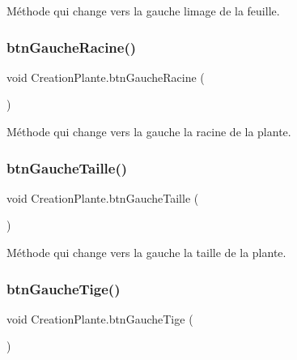 Méthode qui change vers la gauche l\textquotesingle{}image de la feuille. \mbox{\label{class_creation_plante_a8040abc57585cfdc860023bf0e87ba90}} 
\subsubsection{\texorpdfstring{btn\+Gauche\+Racine()}{btnGaucheRacine()}}
{\footnotesize\ttfamily void Creation\+Plante.\+btn\+Gauche\+Racine (\begin{DoxyParamCaption}{ }\end{DoxyParamCaption})\hspace{0.3cm}{\ttfamily [inline]}}

Méthode qui change vers la gauche la racine de la plante. \mbox{\label{class_creation_plante_a1f46479d03a573077b9126190c0dcf66}} 
\subsubsection{\texorpdfstring{btn\+Gauche\+Taille()}{btnGaucheTaille()}}
{\footnotesize\ttfamily void Creation\+Plante.\+btn\+Gauche\+Taille (\begin{DoxyParamCaption}{ }\end{DoxyParamCaption})\hspace{0.3cm}{\ttfamily [inline]}}

Méthode qui change vers la gauche la taille de la plante. \mbox{\label{class_creation_plante_a82964db45d17f2c2af4ef609b8c96f3b}} 
\subsubsection{\texorpdfstring{btn\+Gauche\+Tige()}{btnGaucheTige()}}
{\footnotesize\ttfamily void Creation\+Plante.\+btn\+Gauche\+Tige (\begin{DoxyParamCaption}{ }\end{DoxyParamCaption})\hspace{0.3cm}{\ttfamily [inline]}}

